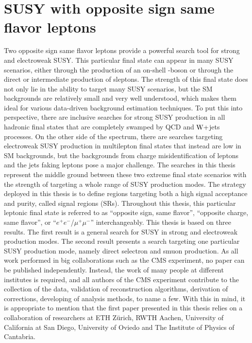 \section{SUSY with opposite sign same flavor leptons}\label{sec:susyOS2l}
\noindent\justify
Two opposite sign same flavor leptons provide a powerful search tool for strong and electroweak SUSY. 
This particular final state can appear in many SUSY scenarios, either through the production of an on-shell \PZ-boson or through the direct or intermediate production of sleptons. 
The strength of this final state does not only lie in the ability to target many SUSY scenarios, but the SM backgrounds are relatively small and very well understood, which makes them ideal for various data-driven background estimation techniques. 
To put this into perspective, there are inclusive searches for strong SUSY production in all hadronic final states that are completely swamped by QCD and $\mathrm{W}+$jets processes. 
On the other side of the spectrum, there are searches targeting electroweak SUSY production in multilepton final states that instead are low in SM backgrounds, but the backgrounds from charge misidentification of leptons and the jets faking leptons pose a major challenge. 
The searches in this thesis represent the middle ground between these two extreme final state scenarios with the strength of targeting a whole range of SUSY production modes.   
The strategy deployed in this thesis is to define regions targeting both a high signal acceptance and purity, called signal regions (SRs).
Throughout this thesis, this particular leptonic final state is referred to as ``opposite sign, same flavor'', ``opposite charge, same flavor'', or ``$e^{+}e^{-}$/$\mu^{+}\mu^{-}$'' interchangeably. 
\newpara
\noindent\justify
This thesis is based on three results. 
The first result \cite{Sirunyan:2017qaj} is a general search for SUSY in strong and electroweak production modes. 
The second result \cite{Sirunyan:2018nwe} presents a search targeting one particular SUSY production mode, namely direct selectron and smuon production.  
As all work performed in big collaborations such as the CMS experiment, no paper can be published independently. 
Instead, the work of many people at different institutes is required, and all authors of the CMS experiment contribute to the collection of the data, validation of reconstruction algorithms, derivation of corrections, developing of analysis methods, to name a few. 
With this in mind, it is appropriate to mention that the first paper presented in this thesis relies on a collaboration of researchers at ETH Z\"{u}rich, RWTH Aachen, University of California at San Diego, University of Oviedo and The Institute of Physics of Cantabria. 
